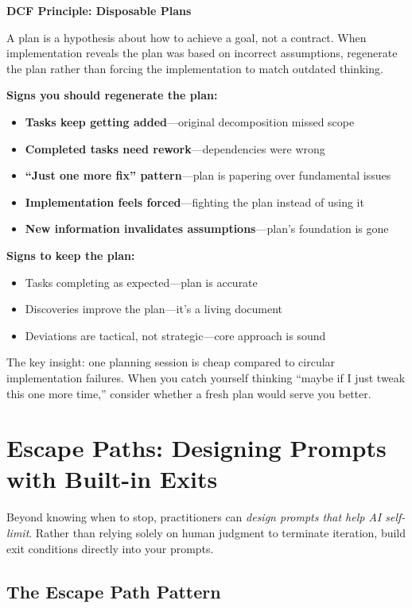 \begin{quotebox}
\textbf{DCF Principle: Disposable Plans}

A plan is a hypothesis about how to achieve a goal, not a contract. When implementation reveals the plan was based on incorrect assumptions, regenerate the plan rather than forcing the implementation to match outdated thinking.
\end{quotebox}

\textbf{Signs you should regenerate the plan:}
\begin{itemize}
    \item \textbf{Tasks keep getting added}---original decomposition missed scope
    \item \textbf{Completed tasks need rework}---dependencies were wrong
    \item \textbf{``Just one more fix'' pattern}---plan is papering over fundamental issues
    \item \textbf{Implementation feels forced}---fighting the plan instead of using it
    \item \textbf{New information invalidates assumptions}---plan's foundation is gone
\end{itemize}

\textbf{Signs to keep the plan:}
\begin{itemize}
    \item Tasks completing as expected---plan is accurate
    \item Discoveries improve the plan---it's a living document
    \item Deviations are tactical, not strategic---core approach is sound
\end{itemize}

The key insight: one planning session is cheap compared to circular implementation failures. When you catch yourself thinking ``maybe if I just tweak this one more time,'' consider whether a fresh plan would serve you better.

\section{Escape Paths: Designing Prompts with Built-in Exits}

Beyond knowing when to stop, practitioners can \emph{design prompts that help AI self-limit}. Rather than relying solely on human judgment to terminate iteration, build exit conditions directly into your prompts.

\subsection{The Escape Path Pattern}

